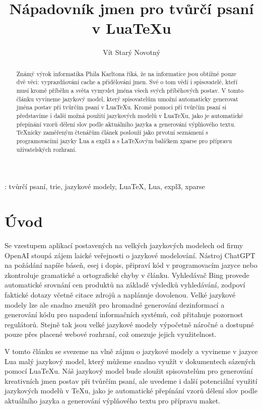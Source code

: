 \documentclass{csbulletin}
\begin{document}

\title{Nápadovník jmen pro tvůrčí psaní v Lua\TeX u}
\author{Vít Starý Novotný}
\maketitle[1ex]

\begin{abstract}
Známý výrok informatika Phila Karltona říká, že na informatice jsou obtížné pouze dvě věci: vyprazdňování cache a přidělování jmen. Své o tom vědí i spisovatelé, kteří musí kromě příběhu a světa vymyslet jména všech svých příběhových postav. V tomto článku vyvineme jazykový model, který spisovatelům umožní automaticky generovat jména postav při tvůrčím psaní v Lua\TeX u. Kromě pomoci při tvůrčím psaní si představíme i další možná použití jazykových modelů v Lua\TeX u, jako je automatické přepínání vzorů dělení slov podle aktuálního jazyka a generování výplňového textu. \TeX nicky zaměřeným čtenářům článek poslouží jako prvotní seznámení s programovacími jazyky Lua a expl3 a s \LaTeX ovým balíčkem xparse pro přípravu uživatelských rozhraní.
\end{abstract}
\klicovaslova: tvůrčí psaní, trie, jazykové modely, Lua\TeX, Lua, expl3, xparse

\section*{Úvod}
Se vzestupem aplikací postavených na velkých jazykových modelech od firmy OpenAI stoupá zájem laické veřejnosti o jazykové modelování. Nástroj ChatGPT na požádání napíše báseň, esej i dopis, připraví kód v programovacím jazyce nebo zkontroluje gramatické a ortografické chyby v článku. Vyhledávač Bing provede automatické srovnání cen produktů na základě výsledků vyhledávání, zodpoví faktické dotazy včetně citace zdrojů a naplánuje dovolenou. Velké jazykové modely lze ale snadno zneužít pro hromadné generování dezinformací a generování kódu pro napadení informačních systémů, což přitahuje pozornost regulátorů. Stejně tak jsou velké jazykové modely výpočetně náročné a dostupné pouze přes placené webové rozhraní, což omezuje jejich využitelnost.

V tomto článku se svezeme na vlně zájmu o jazykové modely a vyvineme v jazyce Lua malý jazykový model, který můžeme snadno využít v dokumentech sázených pomocí Lua\TeX u. Náš jazykový model bude sloužit spisovatelům pro generování kreativních jmen postav při tvůrčím psaní, ale uvedeme i další potenciální využití jazykových modelů v \TeX u, jako je automatické přepínání vzorů dělení slov podle aktuálního jazyka a generování výplňového textu pro přípravu maket.
\end{document}
